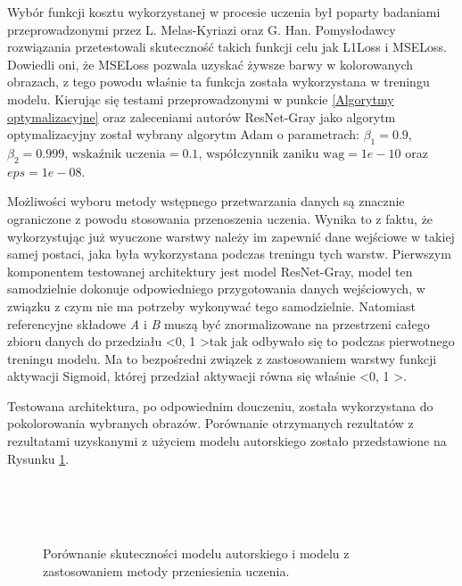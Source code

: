   Wybór funkcji kosztu wykorzystanej w procesie uczenia był poparty badaniami
  przeprowadzonymi przez L. Melas-Kyriazi oraz G. Han.
  Pomysłodawcy rozwiązania przetestowali skuteczność takich funkcji celu jak L1Loss i MSELoss. Dowiedli
  oni, że MSELoss pozwala uzyskać żywsze barwy w kolorowanych obrazach, z tego
  powodu właśnie ta funkcja została wykorzystana w treningu modelu.
  Kierując się testami przeprowadzonymi w punkcie \ref{Algorytmy optymalizacyjne}
  oraz zaleceniami autorów ResNet-Gray jako algorytm optymalizacyjny został
  wybrany algorytm Adam o parametrach: $\beta_{1} = 0.9$, $\beta_{2} = 0.999$,
  $\text{wskaźnik uczenia} = 0.1$, $\text{współczynnik zaniku wag} = 1e-10$ oraz
  $eps=1e-08$.

  Możliwości wyboru metody wstępnego przetwarzania danych są znacznie ograniczone
  z powodu stosowania przenoszenia uczenia. Wynika to z faktu, że wykorzystując
  już wyuczone warstwy należy im zapewnić dane wejściowe w takiej samej postaci,
  jaka była wykorzystana podczas treningu tych warstw. Pierwszym komponentem
  testowanej architektury jest model ResNet-Gray, model ten
  samodzielnie dokonuje odpowiedniego przygotowania danych wejściowych, w związku
  z czym nie ma potrzeby wykonywać tego samodzielnie. Natomiast referencyjne
  składowe \textit{A} i \textit{B} muszą być znormalizowane na przestrzeni
  całego zbioru danych do przedziału \textless 0, 1 \textgreater tak jak odbywało
  się to podczas pierwotnego treningu modelu. Ma to
  bezpośredni związek z zastosowaniem warstwy funkcji aktywacji Sigmoid, której
  przedział aktywacji równa się właśnie \textless 0, 1 \textgreater.

  Testowana architektura, po odpowiednim douczeniu, została wykorzystana do
  pokolorowania wybranych obrazów. Porównanie otrzymanych rezultatów z rezultatami
  uzyskanymi z użyciem modelu autorskiego zostało przedstawione na Rysunku
  \ref{fig:porownanie_modeli}.

  \begin{figure}[ht]
    \centering
    \captionsetup{justification=centering}
     \\
     \\
     \\
    \caption[Porównanie skuteczności modelu autorskiego i modelu z zastosowaniem
    metody przeniesienia uczenia - źródło: Rysunek własny bazujący na:
    \url{https://fr.m.wikipedia.org/wiki/Fichier:An_F-A-18C_Hornet_launches_from_the_flight_deck_of_the_conventionally_powered_aircraft_carrier.jpg},
    \url{https://pl.wikipedia.org/wiki/Plik:PL_Bagno_Calowanie_2.jpg},
    \url{https://cdn.thearthunters.com/wp-content/uploads/2013/06/bg-960x636.jpg}]
    {Porównanie skuteczności modelu autorskiego i modelu z zastosowaniem metody
    przeniesienia uczenia.}
    \label{fig:porownanie_modeli}
  \end{figure}

